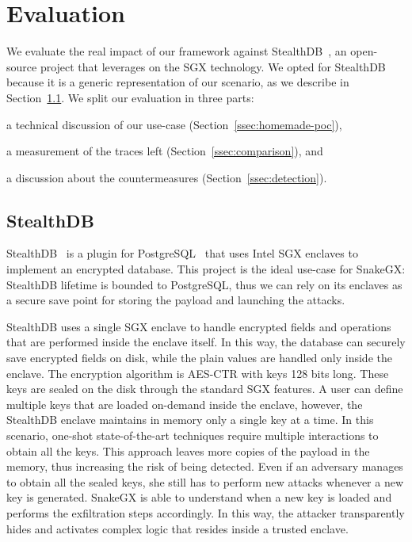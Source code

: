 \section{Evaluation}
\label{sec:evaluation_snakegx}

We evaluate the real impact of our framework against StealthDB~\cite{stealthdb},
an open-source project that leverages on the SGX technology.
We opted for StealthDB because it is a generic representation of our scenario, 
as we describe in Section~\ref{ssec:stealthdb}.
We split our evaluation in three parts:
\begin{enumerate*}[label=(\roman*)]
	\item a technical discussion of our use-case 
	(Section~\ref{ssec:homemade-poc}),
	\item a measurement of the traces left (Section~\ref{ssec:comparison}), and
	\item a discussion about the countermeasures (Section~\ref{ssec:detection}).
\end{enumerate*}

\subsection{StealthDB}
\label{ssec:stealthdb}
StealthDB~\cite{stealthdb} is a plugin for PostgreSQL~\cite{postgresql} that
uses Intel SGX enclaves to implement an encrypted database.
This project is the ideal use-case for SnakeGX: StealthDB lifetime is bounded 
to PostgreSQL, thus we can rely on its enclaves as a secure save point for 
storing the payload and launching the attacks.

StealthDB uses a single SGX enclave to handle encrypted fields and operations 
that are performed inside the enclave itself.
In this way, the database can securely save encrypted fields on disk, while the
plain values are handled only inside the enclave.
The encryption algorithm is AES-CTR with keys 128 bits long. These keys are 
sealed on 
the disk through the standard SGX features.
A user can define multiple keys that are loaded on-demand inside 
the enclave, however, the StealthDB enclave maintains in memory only a single 
key at a time.
In this scenario, one-shot state-of-the-art techniques 
require multiple interactions to obtain all the keys. 
This approach leaves more copies of the payload in the memory, thus increasing
the risk of being detected.
Even if an adversary manages to obtain all the sealed keys, she still has 
to perform new attacks whenever a new key is generated.
SnakeGX is able to understand when a new key is loaded and performs the 
exfiltration steps accordingly. In this way, the attacker transparently hides 
and activates complex logic that resides inside a trusted enclave. 

